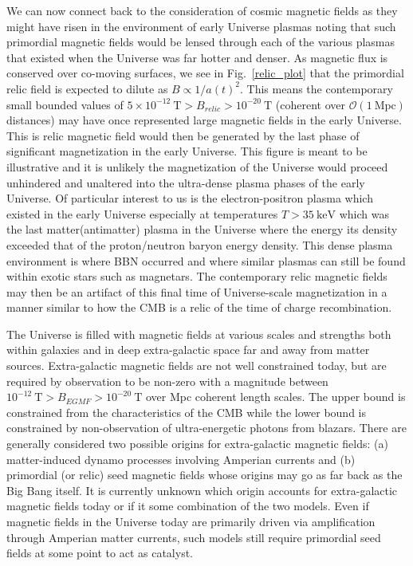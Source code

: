 \documentclass[universe,article,submit,moreauthors,pdftex,a4paper]{Definitions/mdpi}
\newcommand*{\rf}[1]{Fig.~{\ref{#1}}}
\begin{document}
We can now connect back to the consideration of cosmic magnetic fields as they might have risen in the environment of early Universe plasmas noting that such primordial magnetic fields would be lensed through each of the various plasmas that existed when the Universe was far hotter and denser. As magnetic flux is conserved over co-moving surfaces, we see in \rf{relic_plot} that the primordial relic field is expected to dilute as $B\propto1/a(t)^{2}$. This means the contemporary small bounded values of $5\times10^{-12}\ \mathrm{T}>B_{relic}>10^{-20}\ \mathrm{T}$ (coherent over $\mathcal{O}(1\ \mathrm{Mpc})$ distances) may have once represented large magnetic fields in the early Universe. This is relic magnetic field would then be generated by the last phase of significant magnetization in the early Universe. This figure is meant to be illustrative and it is unlikely the magnetization of the Universe would proceed unhindered and unaltered into the ultra-dense plasma phases of the early Universe. Of particular interest to us is the electron-positron plasma which existed in the early Universe especially at temperatures $T>35\ \mathrm{keV}$ which was the last matter(antimatter) plasma in the Universe where the energy its density exceeded that of the proton/neutron baryon energy density. This dense plasma environment is where BBN occurred and where similar plasmas can still be found within exotic stars such as magnetars. The contemporary relic magnetic fields may then be an artifact of this final time of Universe-scale magnetization in a manner similar to how the CMB is a relic of the time of charge recombination.

The Universe is filled with magnetic fields at various scales and strengths both within galaxies and in deep extra-galactic space far and away from matter sources. Extra-galactic magnetic fields are not well constrained today, but are required by observation to be non-zero with a magnitude between $10^{-12}\ \mathrm{T}>B_{EGMF}>10^{-20}\ \mathrm{T}$ over Mpc coherent length scales. The upper bound is constrained from the characteristics of the CMB while the lower bound is constrained by non-observation of ultra-energetic photons from blazars. There are generally considered two possible origins for extra-galactic magnetic fields: (a) matter-induced dynamo processes involving Amperian currents and (b) primordial (or relic) seed magnetic fields whose origins may go as far back as the Big Bang itself. It is currently unknown which origin accounts for extra-galactic magnetic fields today or if it some combination of the two models. Even if magnetic fields in the Universe today are primarily driven via amplification through Amperian matter currents, such models still require primordial seed fields at some point to act as catalyst.
\end{document}
